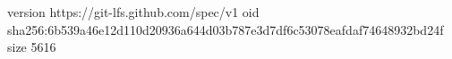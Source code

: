 version https://git-lfs.github.com/spec/v1
oid sha256:6b539a46e12d110d20936a644d03b787e3d7df6c53078eafdaf74648932bd24f
size 5616
